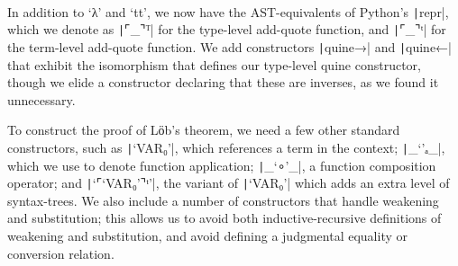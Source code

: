 \begin{code}
\\
\>[2]\<[3]%
\>[3] \AgdaSymbol{:}  \AgdaSymbol{\{} \AgdaSymbol{\}}\<%
\\
\>[3]\<[5]%
\>[5]     \AgdaSymbol{(}  \AgdaSymbol{)}\<%
\\
\>[0]\<[3]%
\>[3] \AgdaSymbol{:}  \AgdaSymbol{\{}  \AgdaSymbol{\}}\<%
\\
\>[3]\<[5]%
\>[5]  \AgdaSymbol{(}  \AgdaSymbol{)}   \AgdaSymbol{(}    \AgdaSymbol{(} \AgdaSymbol{))}\<%
\\
\>[0]\<[3]%
\>[3] \AgdaSymbol{:}  \AgdaSymbol{\{} \AgdaSymbol{\}}\<%
\\
\>[3]\<[5]%
\>[5]  \AgdaSymbol{(}  \AgdaSymbol{)}      \<%
\end{code}

  In addition to ‘λ’ and ‘tt’, we now have the AST-equivalents of
  Python's \texttt|repr|, which we denote as
  \texttt|⌜_⌝ᵀ| for the type-level add-quote function, and
  \texttt|⌜_⌝ᵗ| for the term-level add-quote function.  We
  add constructors \texttt|quine→| and
  \texttt|quine←| that exhibit the isomorphism that defines
  our type-level quine constructor, though we elide a constructor
  declaring that these are inverses, as we found it unnecessary.

  To construct the proof of Lӧb's theorem, we need a few other
  standard constructors, such as \texttt|‘VAR₀’|, which
  references a term in the context; \texttt|_‘’ₐ_|, which we
  use to denote function application; \texttt|_‘∘’_|, a
  function composition operator; and \texttt|‘⌜‘VAR₀’⌝ᵗ’|,
  the variant of \texttt|‘VAR₀’| which adds an extra level
  of syntax-trees. We also include a number of constructors that
  handle weakening and substitution; this allows us to avoid both
  inductive-recursive definitions of weakening and substitution, and
  avoid defining a judgmental equality or conversion relation.

